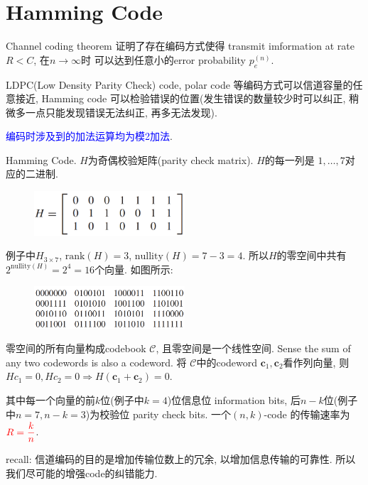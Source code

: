 \section{Hamming Code}
Channel coding theorem 证明了存在编码方式使得 transmit imformation at rate $R<C$, 在$n\to \infty$时 可以达到任意小的error probability $p_e^{(n)}$.

LDPC(Low Density Parity Check) code, polar code 等编码方式可以信道容量的任意接近, Hamming code 可以检验错误的位置(发生错误的数量较少时可以纠正, 稍微多一点只能发现错误无法纠正, 再多无法发现).

\textcolor{blue}{编码时涉及到的加法运算均为模2加法}.

\begin{definition}
Hamming Code. $H$为奇偶校验矩阵(parity check matrix). $H$的每一列是 $1,\ldots, 7$对应的二进制.
\end{definition}
\begin{figure}[htbp]
    \centering
    \includegraphics[width=0.5\textwidth]{./figures/chapter5/parity_check_matrix.png}
\end{figure}
例子中$H_{3\times 7}$, $\text{rank}(H)=3$, $\text{nullity}(H)=7-3=4$. 所以$H$的零空间中共有$2^{\text{nullity}(H)}=2^4=16$个向量. 如图所示:

\begin{figure}[htbp]
    \centering
    \includegraphics[width=0.5\textwidth]{./figures/chapter5/null(H).png}
\end{figure}

零空间的所有向量构成codebook $\mathcal{C}$, 且零空间是一个线性空间. Sense the sum of any two codewords is also a codeword. 将 $\mathcal{C}$中的codeword $\mathbf{c}_1,\mathbf{c}_2$看作列向量, 则 $Hc_1=0, Hc_2=0\Rightarrow H(\mathbf{c}_1+\mathbf{c}_2)=0$.

其中每一个向量的前$k$位(例子中$k=4$)位信息位 information bits, 后$n-k$位(例子中$n=7, n-k=3$)为校验位 parity check bits. 一个$(n,k)$-code 的传输速率为 $\textcolor{red}{R=\dfrac{k}{n}}$.

recall: 信道编码的目的是增加传输位数上的冗余, 以增加信息传输的可靠性. 所以我们尽可能的增强code的纠错能力.

